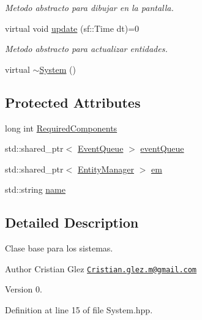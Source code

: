 \begin{DoxyCompactItemize}
\begin{DoxyCompactList}\small\item\em Metodo abstracto para dibujar en la pantalla. \end{DoxyCompactList}\item 
virtual void \hyperlink{classant_1_1_system_a4d97de105123df07d4d90ac2914f9e6c}{update} (sf\+::\+Time dt)=0
\begin{DoxyCompactList}\small\item\em Metodo abstracto para actualizar entidades. \end{DoxyCompactList}\item 
virtual \hyperlink{classant_1_1_system_aa8ab4b23645603d6f50934d3ebe8b37d}{$\sim$\+System} ()
\end{DoxyCompactItemize}
\subsection*{Protected Attributes}
\begin{DoxyCompactItemize}
\item 
long int \hyperlink{classant_1_1_system_a4ef41cfc496e41ac6730f90629524ec7}{Required\+Components}
\item 
std\+::shared\+\_\+ptr$<$ \hyperlink{classant_1_1_event_queue}{Event\+Queue} $>$ \hyperlink{classant_1_1_system_a27e1814e13d161b5ef0e848e3da16d29}{event\+Queue}
\item 
std\+::shared\+\_\+ptr$<$ \hyperlink{classant_1_1_entity_manager}{Entity\+Manager} $>$ \hyperlink{classant_1_1_system_a5661d872ff769be150bd4e9a9552f6b9}{em}
\item 
std\+::string \hyperlink{classant_1_1_system_a60b3c00a760a3b4947ab1f1fc534a5b2}{name}
\end{DoxyCompactItemize}


\subsection{Detailed Description}
Clase base para los sistemas. 

\begin{DoxyAuthor}{Author}
Cristian Glez \href{mailto:Cristian.glez.m@gmail.com}{\tt Cristian.\+glez.\+m@gmail.\+com} 
\end{DoxyAuthor}
\begin{DoxyVersion}{Version}
0. 
\end{DoxyVersion}


Definition at line 15 of file System.\+hpp.



